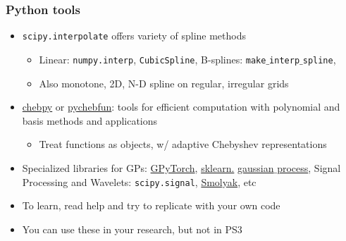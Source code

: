 \documentclass[bigger]{beamer}
\begin{document}
\begin{frame}%

\frametitle{Python tools}

\begin{itemize}
\item \texttt{scipy.interpolate} offers variety of spline methods

\begin{itemize}
\item Linear: \texttt{numpy.interp}, \texttt{CubicSpline}, B-splines: \texttt{make}$\_$\texttt{interp}$\_$\texttt{spline}, 

\item Also monotone, 2D, N-D spline on regular, irregular grids

\end{itemize}

\item \href{https://github.com/chebpy/chebpy}{chebpy} or \href{https://github.com/pychebfun/pychebfun}{pychebfun}: tools for efficient computation with polynomial and basis methods and applications
\begin{itemize}
\item Treat functions as objects, w/ adaptive Chebyshev representations 
\end{itemize}

\item Specialized libraries for GPs: \href{https://gpytorch.ai/}{GPyTorch}, \href{https://scikit-learn.org/stable/modules/gaussian_process.html}{sklearn.} \href{https://scikit-learn.org/stable/modules/gaussian_process.html}{gaussian}$\_$\href{https://scikit-learn.org/stable/modules/gaussian_process.html}{process}, Signal Processing and Wavelets: \texttt{scipy.signal}, \href{https://github.com/EconForge/Smolyak}{Smolyak}, etc 

\item To learn, read help and try to replicate with your own code

\item You can use these in your research, but not in PS3
\end{itemize}


\end{frame}%
\end{document}
